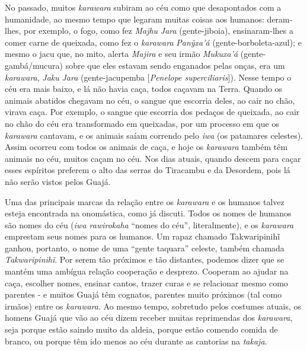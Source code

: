 No passado, muitos \emph{karawara} subiram ao céu como que desapontados
com a humanidade, ao mesmo tempo que legaram muitas coisas aos humanos:
deram-lhes, por exemplo, o fogo, como fez \emph{Majhu} \emph{Jara}
(gente-jiboia), ensinaram-lhes a comer carne de queixada, como fez o
\emph{karawara} \emph{Panỹxa'á} (gente-borboleta-azul); e mesmo o jacu
que, no mito, alerta \emph{Majira} e seu irmão \emph{Mukuxa'á}
(gente-gambá/mucura) sobre que eles estavam sendo enganados pelas onças,
era um \emph{karawara}, \emph{Jaku} \emph{Jara} (gente-jacupemba
{[}\emph{Penelope superciliaris}{]}). Nesse tempo o céu era mais baixo,
e lá não havia caça, todos caçavam na Terra. Quando os animais abatidos
chegavam no céu, o sangue que escorria deles, ao cair no chão, virava
caça. Por exemplo, o sangue que escorria dos pedaços de queixada, ao
cair no chão do céu era transformado em queixadas, por um processo em
que os \emph{karawara} cantavam, e os animais saíam correndo pelo
\emph{iwa} (os patamares celestes). Assim ocorreu com todos os animais
de caça, e hoje os \emph{karawara} também têm animais no céu, muitos
caçam no céu. Nos dias atuais, quando descem para caçar esses espíritos
preferem o alto das serras do Tiracambu e da Desordem, pois lá não serão
vistos pelos Guajá.

Uma das principais marcas da relação entre os \emph{karawara} e os
humanos talvez esteja encontrada na onomástica, como já discuti. Todos
os nomes de humanos são nomes do céu (\emph{iwa rawirokaha} ``nomes do
céu'', literalmente), e os \emph{karawara} emprestam seus nomes para os
humanos. Um rapaz chamado Takwaripinihĩ ganhou, portanto, o nome de uma
``gente taquara'' celeste, também chamada \emph{Takwaripinihĩ}. Por
serem tão próximos e tão distantes, podemos dizer que se mantém uma
ambígua relação cooperação e desprezo. Cooperam ao ajudar na caça,
escolher nomes, ensinar cantos, trazer curas e se relacionar mesmo como
parentes - e muitos Guajá têm cognatos, parentes muito próximos (tal
como irmãos) entre os \emph{karawara}. Ao mesmo tempo, sobretudo pelos
costumes atuais, os homens Guajá que vão ao céu dizem receber muitas
reprimendas dos \emph{karawara}, seja porque estão saindo muito da
aldeia, porque estão comendo comida de branco, ou porque têm ido menos
ao céu durante as cantorias na \emph{takaja}.

